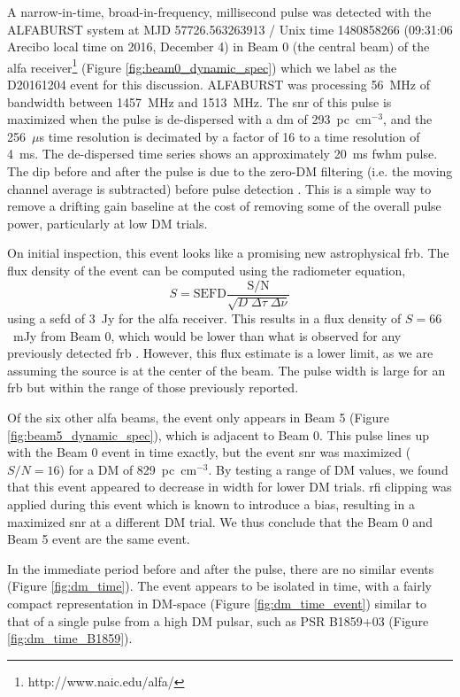\documentclass[a4paper,fleqn,usenatbib]{mnras}
\begin{document}
A narrow-in-time, broad-in-frequency, millisecond pulse was detected with the
ALFABURST system at MJD 57726.563263913 / Unix time 1480858266 (09:31:06 Arecibo
local time on 2016, December 4) in Beam 0 (the central beam) of the \gls{alfa}
receiver\footnote{http://www.naic.edu/alfa/} (Figure
\ref{fig:beam0_dynamic_spec}) which we label as the D20161204 event for this
discussion. ALFABURST was processing 56~MHz of bandwidth between 1457~MHz and
1513~MHz. The \gls{snr} of this pulse is maximized when the pulse is de-dispersed
with a \gls{dm} of 293~pc~cm$^{-3}$, and the 256~$\mu$s time resolution is decimated
by a factor of 16 to a time resolution of 4~ms. The de-dispersed time series shows
an approximately 20~ms \gls{fwhm} pulse.  The dip before and after the pulse is
due to the zero-DM filtering (i.e. the moving channel average is subtracted) before
pulse detection \citep{2009MNRAS.395..410E}. This is a simple way to remove a
drifting gain baseline at the cost of removing some of the overall pulse power,
particularly at low DM trials.

On initial inspection, this event looks like a promising new astrophysical
\gls{frb}. The flux density of the event can be computed using the radiometer
equation,
%
$$
S = \textrm{SEFD} \frac{\textrm{S/N}}{\sqrt{D \; \Delta \tau \;
\Delta \nu}}
$$
%
using a \gls{sefd} of 3~Jy for the \gls{alfa} receiver. This results in a flux
density of \mbox{$S = 66$}~mJy from Beam 0, which would be lower than what is observed for any
previously detected \gls{frb} \citep{2016PASA...33...45P}. However, this flux
estimate is a lower limit, as we are assuming the source is at the center of the
beam. The pulse width is large for an \gls{frb} but within the range of those
previously reported.

Of the six other \gls{alfa} beams, the event only appears in Beam 5 (Figure
\ref{fig:beam5_dynamic_spec}), which is adjacent to Beam 0.  This pulse lines up
with the Beam 0 event in time exactly, but the event \gls{snr} was maximized
($S/N=16$) for a DM of 829~pc~cm$^{-3}$. By testing a range of DM values, we
found that this event appeared to decrease in width for lower DM trials.
\gls{rfi} clipping was applied during this event which is known to introduce a
bias, resulting in a maximized \gls{snr} at a different DM trial.  We thus conclude
that the Beam 0 and Beam 5 event are the same event.

In the immediate period before and after the pulse, there are no similar events
(Figure \ref{fig:dm_time}). The event appears to be isolated in time, with a
fairly compact representation in DM-space (Figure \ref{fig:dm_time_event})
similar to that of a single pulse from a high DM pulsar, such as PSR B1859+03
(Figure \ref{fig:dm_time_B1859}).
\end{document}
